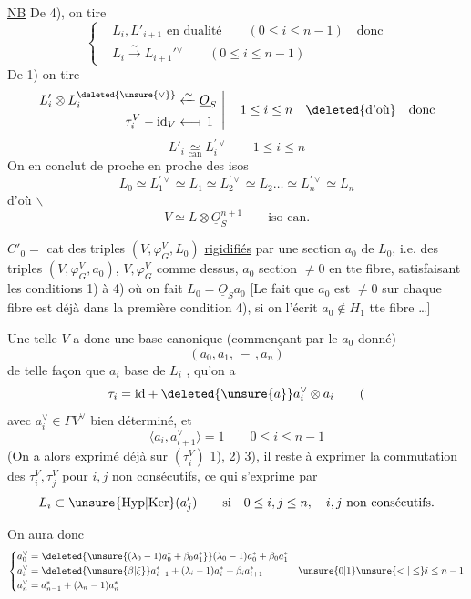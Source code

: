 \uline{NB} De 4), on tire
\[
\left\{\begin{aligned}
&L_i,L'_{i+1}\text{ en dualité}\qquad (0\leq i\leq n-1)\quad\text{donc}\\
&L_i\xrightarrow{\sim}L_{i+1}'{}^\vee\qquad (0\leq i\leq n-1)
\end{aligned}\right.
\]
De 1) on tire
\[
\left.\begin{aligned}
L'_i\otimes L_i^{\deleted{\unsure{\vee}}}&\xleftarrow{\sim}\underline O_S\\
\tau_i^V-\mathrm{id}_V&\longleftarrow\!\shortmid\,1
\end{aligned}\ \right|\quad 1\leq i\leq n\quad \deleted{\text{d'où}}\quad\text{donc}
\]
\[
L'_i\underset{\mathrm{can}}{\simeq} L_i^{\prime\vee}\qquad 1\leq i\leq n
\]
On en conclut de proche en proche des isos
\[
L_0\simeq L_1^{\prime\vee}\simeq L_1\simeq L_2^{\prime\vee}\simeq L_2\ldots\simeq L_n^{\prime\vee}\simeq L_n
\]
d'où $\backslash$
\[
V\simeq L\otimes\underline O_S^{n+1}\qquad\text{iso can.}
\]

$\boxed{C'_0}={}$ cat des triples $(V,\varphi_G^V,L_0)$ \uline{rigidifiés} par une section $a_0$ de $L_0$, i.e. des triples $(V,\varphi_G^V,a_0)$,  $V,\varphi_G^V$ comme dessus, $a_0$ section $\ne0$ en tte fibre, satisfaisant les conditions 1) à 4) où on fait $L_0=\underline O_S a_0$ [Le fait que $a_0$ est $\ne0$ sur chaque fibre est déjà  dans la première condition 4), si on l'écrit $a_0\notin H_1$  tte fibre \ldots]


Une telle $V$ a donc une base canonique (commençant par le $a_0$ donné)
\[
(a_0,a_1,\,-\,,a_n)
\]
de telle façon que  $a_i$  base de $L_i$ ,  qu'on a
\[
\tau_i=\mathrm{id}+\deleted{\unsure{a}}a_i^\vee\otimes a_i\qquad (
\]
avec $a_i^\vee\in\Gamma V^\vee$ bien déterminé, et
\[
\langle a_i,a_{i+1}^\vee\rangle=1\qquad 0\leq i\leq n-1
\]
(On a alors exprimé déjà  sur $(\tau_i^V)$ 1), 2) 3), il  reste à exprimer  la commutation des $\tau_i^V,\tau_j^V$ pour $i,j$ non consécutifs, ce qui s'exprime par
\[
L_i\subset\unsure{\mathrm{Hyp}|\mathrm{Ker}}(a'_j)\qquad\text{si}\quad 0\leq i,j\leq n,\quad i,j\text{ non consécutifs.}
\]

On aura donc
\[
\left\{\begin{aligned}
 a_0^\vee&=\deleted{\unsure{(\lambda_0-1)a_0^*+\beta_0a_1^*}}(\lambda_0-1)a_0^*+\beta_0a_1^*\\
 a_i^\vee&=\deleted{\unsure{\beta|\xi}}a_{i-1}^*+(\lambda_i-1)a_i^*+\beta_i a_{i+1}^* & \unsure{0|1}\unsure{<|\leq}i\leq n-1\\
 a_n^\vee&=a_{n-1}^*+(\lambda_n-1)a_n^*
\end{aligned}\right.
\]

